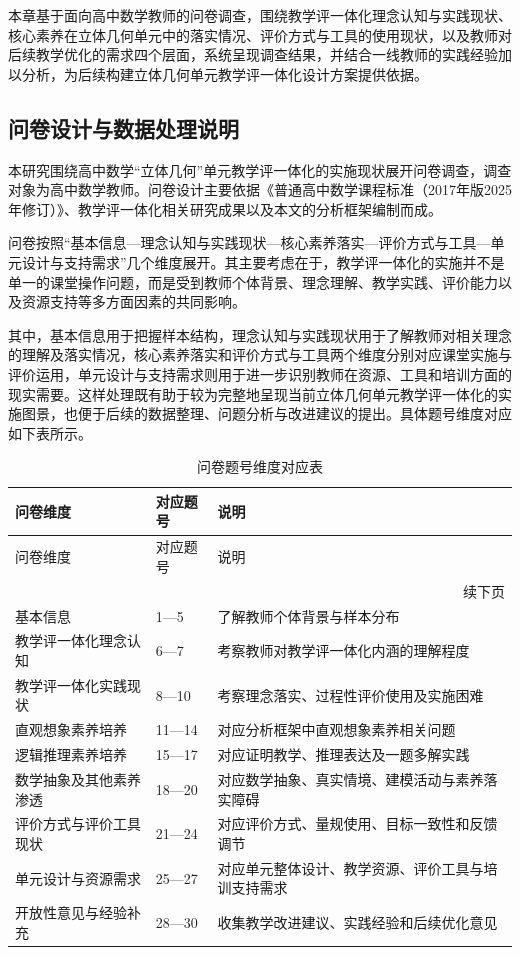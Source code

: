 \documentclass[UTF8,a4paper,12pt,twoside]{ctexart}
\begin{document}
本章基于面向高中数学教师的问卷调查，围绕教学评一体化理念认知与实践现状、核心素养在立体几何单元中的落实情况、评价方式与工具的使用现状，以及教师对后续教学优化的需求四个层面，系统呈现调查结果，并结合一线教师的实践经验加以分析，为后续构建立体几何单元教学评一体化设计方案提供依据。

\subsection{问卷设计与数据处理说明}

本研究围绕高中数学“立体几何”单元教学评一体化的实施现状展开问卷调查，调查对象为高中数学教师。问卷设计主要依据《普通高中数学课程标准（2017年版2025年修订）》、教学评一体化相关研究成果以及本文的分析框架编制而成。


问卷按照“基本信息—理念认知与实践现状—核心素养落实—评价方式与工具—单元设计与支持需求”几个维度展开。其主要考虑在于，教学评一体化的实施并不是单一的课堂操作问题，而是受到教师个体背景、理念理解、教学实践、评价能力以及资源支持等多方面因素的共同影响。

其中，基本信息用于把握样本结构，理念认知与实践现状用于了解教师对相关理念的理解及落实情况，核心素养落实和评价方式与工具两个维度分别对应课堂实施与评价运用，单元设计与支持需求则用于进一步识别教师在资源、工具和培训方面的现实需要。这样处理既有助于较为完整地呈现当前立体几何单元教学评一体化的实施图景，也便于后续的数据整理、问题分析与改进建议的提出。具体题号维度对应如下表所示。

\renewcommand\arraystretch{1.5}
\begin{longtable}{|p{}|p{}|p{}|}
\caption{问卷题号维度对应表} \\
\hline
问卷维度 & 对应题号 & 说明 \\
\hline
\endfirsthead

\hline
问卷维度 & 对应题号 & 说明 \\
\hline
\endhead

\hline
\multicolumn{3}{r}{续下页} \\
\endfoot

\hline
\endlastfoot

基本信息 & 1—5 & 了解教师个体背景与样本分布 \\
\hline
教学评一体化理念认知 & 6—7 & 考察教师对教学评一体化内涵的理解程度 \\
\hline
教学评一体化实践现状 & 8—10 & 考察理念落实、过程性评价使用及实施困难 \\
\hline
直观想象素养培养 & 11—14 & 对应分析框架中直观想象素养相关问题 \\
\hline
逻辑推理素养培养 & 15—17 & 对应证明教学、推理表达及一题多解实践 \\
\hline
数学抽象及其他素养渗透 & 18—20 & 对应数学抽象、真实情境、建模活动与素养落实障碍 \\
\hline
评价方式与评价工具现状 & 21—24 & 对应评价方式、量规使用、目标一致性和反馈调节 \\
\hline
单元设计与资源需求 & 25—27 & 对应单元整体设计、教学资源、评价工具与培训支持需求 \\
\hline
开放性意见与经验补充 & 28—30 & 收集教学改进建议、实践经验和后续优化意见 \\
\hline

\end{longtable}
\end{document}
